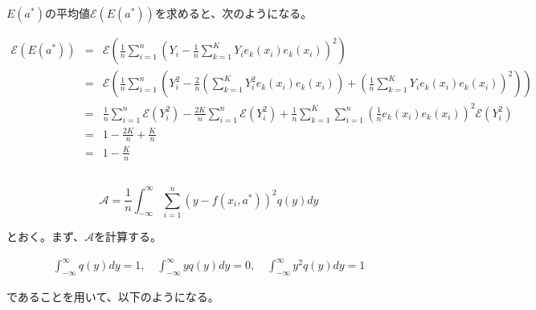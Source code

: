 \documentclass[a4paper,xelatex,ja=standard,jafont=hiragino-pron]{bxjsarticle}
\begin{document}
\subsection{}
$E(a^*)$の平均値$\mathscr{E}(E(a^*))$を求めると、次のようになる。

\begin{eqnarray}
  \mathscr{E}\left(E(a^*)\right)
    &=& \mathscr{E}\left(\frac{1}{n}
      \sum_{i=1}^n
        \left(
          Y_i - \frac{1}{n}\sum_{k=1}^K Y_i e_k(x_i) e_k(x_i)
        \right)^2\right) \nonumber \\
    &=& \mathscr{E}\left(\frac{1}{n} \sum_{i=1}^n
      \left(
        Y_i^2 - \frac{2}{n} \left(
          \sum_{k=1}^K Y_i^2 e_k(x_i) e_k(x_i)
        \right) + \left(
          \frac{1}{n} \sum_{k=1}^K Y_i e_k(x_i) e_k(x_i)
        \right)^2\right)
      \right) \nonumber \\
    &=& \frac{1}{n} \sum_{i=1}^n \mathscr{E} \left(Y_i^2\right) -
      \frac{2K}{n} \sum_{i=1}^n \mathscr{E} \left(Y_i^2\right) +
      \frac{1}{n}
        \sum_{k=1}^K \sum_{i=1}^n
          \left(
            \frac{1}{n}e_k(x_i)e_k(x_i)
          \right)^2  \mathscr{E}(Y_i^2) \nonumber \\
      &=& 1 - \frac{2K}{n} + \frac{K}{n} \nonumber \\
      &=& 1 - \frac{K}{n}
\end{eqnarray}
\subsection{}

\begin{equation}
  \mathscr{A} = \frac{1}{n} \int_{- \infty}^{\infty}\sum_{i=1}^n \left(
    y - f(x_i, a^*)
  \right)^2 q(y) dy
\end{equation}

とおく。まず、$\mathscr{A}$を計算する。

\begin{equation}
  \begin{split}
    \int_{-\infty}^{\infty}q(y)dy = 1, \quad
    \int_{-\infty}^{\infty}yq(y)dy = 0, \quad
    \int_{-\infty}^{\infty}y^2q(y)dy = 1
  \end{split}
\end{equation}

であることを用いて、以下のようになる。
\end{document}
